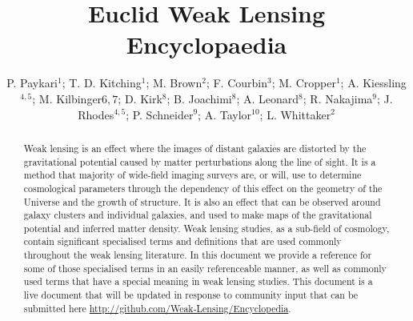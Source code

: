 \documentclass{openjournal}
\begin{document}
\title{Euclid Weak Lensing Encyclopaedia}

\author{P. Paykari$^{1}$; T. D. Kitching$^{1}$; 
M. Brown$^2$; 
F. Courbin$^3$; 
M. Cropper$^{1}$; 
A. Kiessling$^{4,5}$; 
M. Kilbinger${6,7}$; 
D. Kirk$^8$; 
B. Joachimi$^8$; 
A. Leonard$^8$; 
R. Nakajima$^9$; 
J. Rhodes$^{4,5}$; 
P. Schneider$^9$; 
A. Taylor$^{10}$; 
L. Whittaker$^2$}

\begin{abstract}
  Weak lensing is an effect where the images of distant galaxies are
  distorted by the gravitational potential caused by matter
  perturbations along the line of sight. It is a method that majority
  of wide-field imaging surveys are, or will, use to determine
  cosmological parameters through the dependency of this effect on the
  geometry of the Universe and the growth of structure. It is also an
  effect that can be observed around galaxy clusters and individual
  galaxies, and used to make maps of the gravitational potential and
  inferred matter density. Weak lensing studies, as a sub-field of
  cosmology, contain significant specialised terms and definitions
  that are used commonly throughout the weak lensing literature. In
  this document we provide a reference for some of those specialised terms in
  an easily referenceable manner, as well as commonly used terms that
  have a special meaning in weak lensing studies. This document is a live 
  document that will be updated in response to community input that can be 
  submitted here \url{http://github.com/Weak-Lensing/Encyclopedia}. 
\end{abstract}
\end{document}

